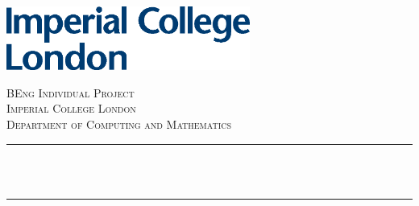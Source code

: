 \begin{titlepage}

\newcommand{\HRule}{\rule{\linewidth}{0.5mm}} %


\includegraphics[width=8cm]{title/logo.eps}\\[1cm] %
 

\center %


\textsc{\LARGE BEng Individual Project}\\[1.5cm] %
\textsc{\Large Imperial College London}\\[0.5cm] %
\textsc{\large Department of Computing and Mathematics}\\[0.5cm] %

\makeatletter
\HRule \\[0.4cm]
{ \huge \bfseries \@title}\\[0.4cm] %
\HRule \\[1.5cm]
 


\end{titlepage}

